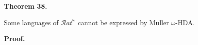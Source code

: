  
 
\par\medskip\noindent\textbf{Theorem 38.}\par
 
 
Some languages of ${\mathcal{R}at}^{\omega}$ cannot be expressed by Muller $\omega$-HDA.\par
 
 
 
 
 
\par\medskip\noindent\textbf{Proof.}\par
 
 

